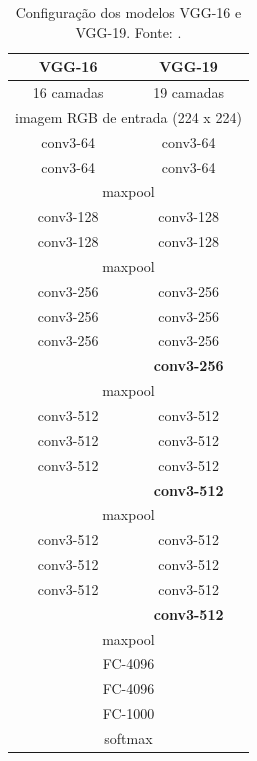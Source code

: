 \begin{table}[!htbp]
    \centering
    \caption{Configuração dos modelos VGG-16 e VGG-19. Fonte: .}
    \label{tab:vgg-arch}
    \footnotesize
    \begin{tabular}{|c|c|}
        \hline
        \textbf{VGG-16} & \textbf{VGG-19} \\
        \hline
        16 camadas & 19 camadas \\
        \hline
        \multicolumn{2}{|c|}{imagem RGB de entrada (224 x 224)} \\
        \hline
        conv3-64 & conv3-64 \\
        conv3-64 & conv3-64 \\
        \hline
        \multicolumn{2}{|c|}{maxpool} \\
        \hline
        conv3-128 & conv3-128 \\
        conv3-128 & conv3-128 \\
        \hline
        \multicolumn{2}{|c|}{maxpool} \\
        \hline
        conv3-256 & conv3-256 \\
        conv3-256 & conv3-256 \\
        conv3-256 & conv3-256 \\
         & \textbf{conv3-256} \\
        \hline
        \multicolumn{2}{|c|}{maxpool} \\
        \hline
        conv3-512 & conv3-512 \\
        conv3-512 & conv3-512 \\
        conv3-512 & conv3-512 \\
         & \textbf{conv3-512} \\
        \hline
        \multicolumn{2}{|c|}{maxpool} \\
        \hline
        conv3-512 & conv3-512 \\
        conv3-512 & conv3-512 \\
        conv3-512 & conv3-512 \\
         & \textbf{conv3-512} \\
        \hline
        \multicolumn{2}{|c|}{maxpool} \\
        \hline
        \multicolumn{2}{|c|}{FC-4096} \\
        \hline
        \multicolumn{2}{|c|}{FC-4096} \\
        \hline
        \multicolumn{2}{|c|}{FC-1000} \\
        \hline
        \multicolumn{2}{|c|}{softmax} \\
        \hline
    \end{tabular}
\end{table}

